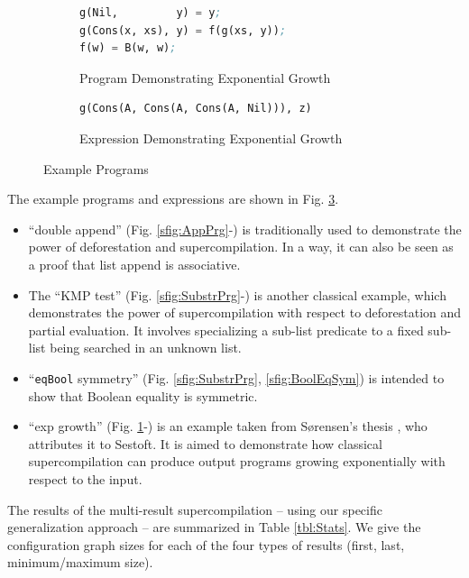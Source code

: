 \documentclass[submission,copyright,creativecommons]{eptcs}
\begin{document}
\begin{figure}
\begin{subfigure}[b]{\linewidth}
\begin{lstlisting}[language=Lisp,keywords={}]
g(Nil,         y) = y;
g(Cons(x, xs), y) = f(g(xs, y));
f(w) = B(w, w);
\end{lstlisting}
\caption{Program Demonstrating Exponential Growth}
\label{sfig:ExpGrowthPrg}
\end{subfigure}

\begin{subfigure}[b]{\linewidth}
\begin{lstlisting}[language=Lisp,keywords={}]
g(Cons(A, Cons(A, Cons(A, Nil))), z)
\end{lstlisting}
\caption{Expression Demonstrating Exponential Growth}
\label{sfig:ExpGrowth}
\end{subfigure}

\caption{Example Programs}\label{fig:Examples}
\end{figure}

The example programs and expressions are shown in Fig. \ref{fig:Examples}.
\begin{itemize}
  \item ``double append'' (Fig. \ref{sfig:AppPrg}-) is traditionally used to 
    demonstrate the power of deforestation and supercompilation.
    In a way, it can also be seen as a proof that list append is associative.
  \item The ``KMP test'' (Fig. \ref{sfig:SubstrPrg}-) is another classical example, 
    which demonstrates the power of supercompilation with respect to deforestation and partial evaluation.
    It involves specializing a sub-list predicate to a fixed sub-list being
    searched in an unknown list.
  \item ``\verb|eqBool| symmetry'' (Fig. \ref{sfig:SubstrPrg}, \ref{sfig:BoolEqSym}) is intended
    to show that Boolean equality is symmetric.
  \item ``exp growth'' (Fig. \ref{sfig:ExpGrowthPrg}-) is an example taken 
    from S{\o}rensen's thesis \cite[Example 11.4.1]{Sorensen1994TurchinSupercompiler}, who attributes it to Sestoft.
    It is aimed to demonstrate how classical supercompilation can produce output programs
    growing exponentially with respect to the input.
\end{itemize}

The results of the multi-result supercompilation -- using our specific generalization approach --
are summarized in Table \ref{tbl:Stats}.
We give the configuration graph sizes for each of the four types of results (first, last, minimum/maximum size).
\end{document}
